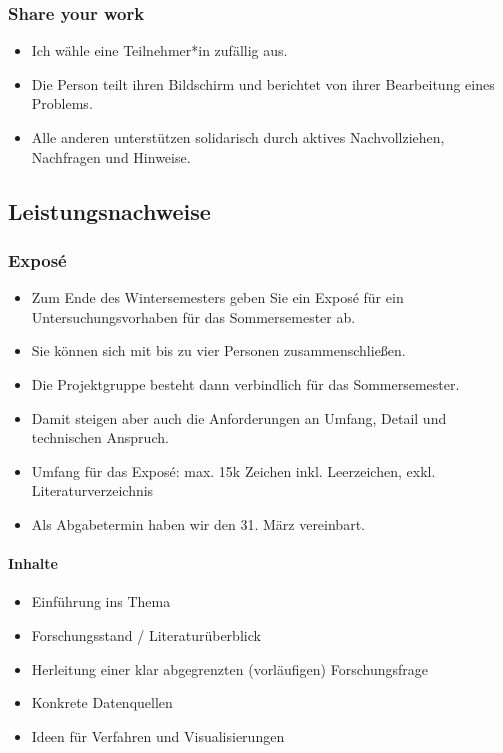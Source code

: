 \documentclass[11pt,german,a4paper]{article}
\providecommand{\tightlist}{%
  \setlength{\itemsep}{0pt}\setlength{\parskip}{0pt}}
\let\oldparagraph\paragraph
\renewcommand{\paragraph}[1]{\oldparagraph{#1}\mbox{}}
\begin{document}
\hypertarget{share-your-work}{%
\subsubsection{Share your work}\label{share-your-work}}

\begin{itemize}
\tightlist
\item
  Ich wähle eine Teilnehmer*in zufällig aus.
\item
  Die Person teilt ihren Bildschirm und berichtet von ihrer Bearbeitung eines Problems.
\item
  Alle anderen unterstützen solidarisch durch aktives Nachvollziehen, Nachfragen und Hinweise.
\end{itemize}

\hypertarget{leistungsnachweise}{%
\subsection{Leistungsnachweise}\label{leistungsnachweise}}

\hypertarget{exposuxe9}{%
\subsubsection{Exposé}\label{exposuxe9}}

\begin{itemize}
\tightlist
\item
  Zum Ende des Wintersemesters geben Sie ein Exposé für ein Untersuchungsvorhaben für das Sommersemester ab.
\item
  Sie können sich mit bis zu vier Personen zusammenschließen.
\item
  Die Projektgruppe besteht dann verbindlich für das Sommersemester.
\item
  Damit steigen aber auch die Anforderungen an Umfang, Detail und technischen Anspruch.
\item
  Umfang für das Exposé: max. 15k Zeichen inkl. Leerzeichen, exkl. Literaturverzeichnis
\item
  Als Abgabetermin haben wir den 31. März vereinbart.
\end{itemize}

\hypertarget{inhalte}{%
\paragraph{Inhalte}\label{inhalte}}

\begin{itemize}
\tightlist
\item
  Einführung ins Thema
\item
  Forschungsstand / Literaturüberblick
\item
  Herleitung einer klar abgegrenzten (vorläufigen) Forschungsfrage
\item
  Konkrete Datenquellen
\item
  Ideen für Verfahren und Visualisierungen
\end{itemize}
\end{document}
